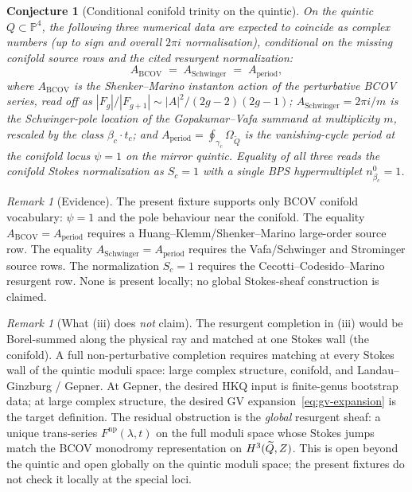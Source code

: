 \documentclass[12pt]{amsart}
\newtheorem{conj}[thm]{Conjecture}
\theoremstyle{remark}
\newtheorem{rmk}[thm]{Remark}
\renewcommand{\P}{\mathbb{P}}
\begin{document}
\begin{conj}[Conditional conifold trinity on the quintic]
  \label{conj:conifold-trinity-quintic}
  On the quintic $Q \subset \P^4$, the following three numerical data
  are expected to coincide as complex numbers (up to sign and overall
  $2\pi i$ normalisation), conditional on the missing conifold source
  rows and the cited resurgent normalization:
  \[
    A_{\mathrm{BCOV}} \;=\; A_{\mathrm{Schwinger}} \;=\; A_{\mathrm{period}},
  \]
  where
  $A_{\mathrm{BCOV}}$ is the Shenker--Marino instanton action of the
  perturbative BCOV series, read off as
  $|F_g| / |F_{g+1}| \sim |A|^2 / (2g-2)(2g-1)$;
  $A_{\mathrm{Schwinger}} = 2\pi i / m$ is the Schwinger-pole
  location of the Gopakumar--Vafa summand at multiplicity $m$,
  rescaled by the class $\beta_c \cdot t_c$;
  and
  $A_{\mathrm{period}} = \oint_{\gamma_c} \Omega_{\widetilde Q}$ is
  the vanishing-cycle period at the conifold locus $\psi = 1$ on
  the mirror quintic. Equality of all three reads the conifold
  Stokes normalization as \(S_c=1\) with a single BPS hypermultiplet
  $n_{\beta_c}^0 = 1$.
\end{conj}

\begin{rmk}[Evidence]
  The present fixture supports only BCOV conifold vocabulary: \(\psi=1\)
  and the pole behaviour near the conifold. The equality
  $A_{\mathrm{BCOV}} = A_{\mathrm{period}}$ requires a
  Huang--Klemm/Shenker--Marino large-order source row. The equality
  $A_{\mathrm{Schwinger}} = A_{\mathrm{period}}$ requires the
  Vafa/Schwinger and Strominger source rows. The normalization
  \(S_c=1\) requires the Cecotti--Codesido--Marino resurgent row. None is
  present locally; no global Stokes-sheaf construction is claimed.
\end{rmk}

\begin{rmk}[What (iii) does \emph{not} claim]
  The resurgent completion in (iii) would be Borel-summed along the
  physical ray and matched at one Stokes wall (the conifold). A full
  non-perturbative completion requires matching at every Stokes wall of
  the quintic moduli space: large complex structure, conifold, and
  Landau--Ginzburg / Gepner. At Gepner, the desired HKQ input is
  finite-genus bootstrap data; at large complex structure, the desired GV
  expansion~\eqref{eq:gv-expansion} is the target definition. The residual
  obstruction is the \emph{global} resurgent sheaf: a unique trans-series
  $F^{\mathrm{np}}(\lambda, t)$ on the full moduli space whose Stokes
  jumps match the BCOV monodromy representation on $H^3(\widetilde Q, Z)$.
  This is open beyond the quintic and open globally on the quintic
  moduli space; the present fixtures do not check it locally at the
  special loci.
\end{rmk}
\end{document}
